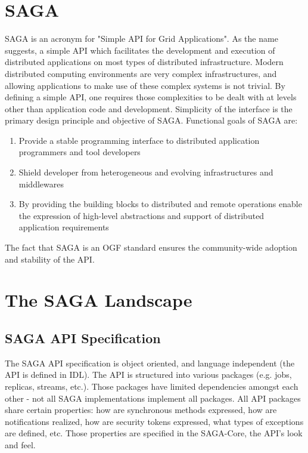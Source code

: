 \documentclass[10pt,conference,final,letterpaper,twoside,twocolumn,]{IEEEtran}
\begin{document}
\section{SAGA}

SAGA is an acronym for "Simple API for Grid Applications". As the name
suggests, a simple API which facilitates the development and execution
of distributed applications on most types of distributed
infrastructure.  Modern distributed computing environments are very
complex infrastructures, and allowing applications to make use of
these complex systems is not trivial.  By defining a simple API, one
requires those complexities to be dealt with at levels other than
application code and development.  Simplicity of the interface is the
primary design principle and objective of SAGA.  Functional goals of
SAGA are:


\begin{enumerate}

\item Provide a stable programming interface to distributed
   application programmers and tool developers
 
\item Shield developer from heterogeneous and evolving
   infrastructures and middlewares

\item By providing the building blocks to distributed and remote
   operations enable the expression of high-level abstractions
   and support of distributed application requirements

\end{enumerate}

The fact that SAGA is an OGF standard ensures the community-wide
adoption and stability of the
API.


\section{The SAGA Landscape}

 \subsection{SAGA API Specification}

  The SAGA API specification is object oriented, and language
  independent (the API is defined in IDL).  The API is structured into
  various packages (e.g. jobs, replicas, streams, etc.).  Those
  packages have limited dependencies amongst each other - not all SAGA
  implementations implement all packages.  All API packages share
  certain properties: how are synchronous methods expressed, how are
  notifications realized, how are security tokens expressed, what
  types of exceptions are defined, etc.  Those properties are
  specified in the SAGA-Core, the API's look and feel.
\end{document}
